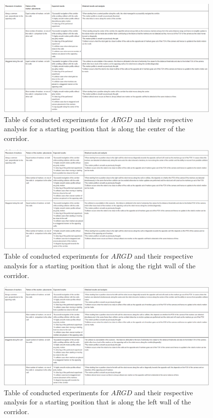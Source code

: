 \begin{figure}
	\centering
	\includegraphics[scale = 0.6]{images/argd_center}
	\caption{Table of conducted experiments for $ARGD$ and their respective analysis for a starting position that is along the center of the corridor.}
	\label{fig:argdcenter}
\end{figure}


\begin{figure}
	\centering
	\includegraphics[scale = 0.6]{images/argd_right}
	\caption{Table of conducted experiments for $ARGD$ and their respective analysis for a starting position that is along the right wall of the corridor.}
	\label{fig:argdright}
\end{figure}

\begin{figure}
	\centering
	\includegraphics[scale = 0.6]{images/argd_left}
	\caption{Table of conducted experiments for $ARGD$ and their respective analysis for a starting position that is along the left wall of the corridor.}
	\label{fig:argdleft}
\end{figure}
 
